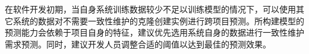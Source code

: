 在软件开发初期，当自身系统训练数据较少不足以训练模型的情况下，可以使用其它系统的数据对不需要一致性维护的克隆创建实例进行跨项目预测。所构建模型的预测能力会依赖于项目自身的特征，建议优先选用系统自身的数据进行一致性维护需求预测。同时，建议开发人员调整合适的阈值以达到最佳的预测效果。


